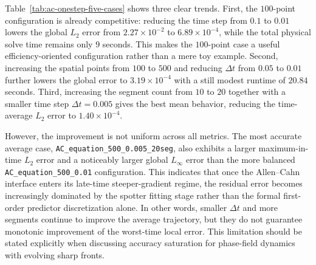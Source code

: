 \begin{table}[t]
    \centering
    \caption{Regression results of five one-step predictor Allen--Cahn benchmarks.}
    \label{tab:ac-onestep-five-cases}
\end{table}

Table~\ref{tab:ac-onestep-five-cases} shows three clear trends. First, the $100$-point configuration is already competitive: reducing the time step from $0.1$ to $0.01$ lowers the global $L_2$ error from $2.27\times10^{-2}$ to $6.89\times10^{-4}$, while the total physical solve time remains only $9$ seconds. This makes the $100$-point case a useful efficiency-oriented configuration rather than a mere toy example. Second, increasing the spatial points from $100$ to $500$ and reducing $\Delta t$ from $0.05$ to $0.01$ further lowers the global error to $3.19\times10^{-4}$ with a still modest runtime of $20.84$ seconds. Third, increasing the segment count from $10$ to $20$ together with a smaller time step $\Delta t=0.005$ gives the best mean behavior, reducing the time-average $L_2$ error to $1.40\times10^{-4}$.

However, the improvement is not uniform across all metrics. The most accurate average case,
\texttt{AC\_equation\_500\_0.005\_20seg}, also exhibits a larger maximum-in-time $L_2$ error and a noticeably larger global $L_\infty$ error than the more balanced
\texttt{AC\_equation\_500\_0.01} configuration. This indicates that once the Allen--Cahn interface enters its late-time steeper-gradient regime, the residual error becomes increasingly dominated by the spotter fitting stage rather than the formal first-order predictor discretization alone. In other words, smaller $\Delta t$ and more segments continue to improve the average trajectory, but they do not guarantee monotonic improvement of the worst-time local error. This limitation should be stated explicitly when discussing accuracy saturation for phase-field dynamics with evolving sharp fronts.


